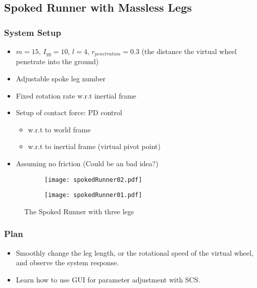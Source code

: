 \subsection{Spoked Runner with Massless Legs}
\subsubsection*{System Setup}
\begin{itemize}

\item $m=15 $, $I_{yy} = 10$,  $l=4$,  $r_{penetration} = 0.3$ (the distance the virtual wheel penetrate into the ground)
\item Adjustable spoke leg number
\item Fixed rotation rate w.r.t inertial frame
\item Setup of contact force: PD control
\begin{itemize}
\item w.r.t to world frame
\item w.r.t to inertial frame (virtual pivot point)
\end{itemize}
\item Assuming no friction (Could be an bad idea?)
\end{itemize}
\begin{figure}[H]
\begin{subfigure}{.5\textwidth}
  \centering
  \texttt{[image: spokedRunner02.pdf]}
\end{subfigure}%
\begin{subfigure}{.5\textwidth}
  \centering
  \texttt{[image: spokedRunner01.pdf]}
\end{subfigure}
\caption{The Spoked Runner with three legs}
\label{fig:spokedRunner}
\end{figure}

\subsubsection*{Plan}

\begin{itemize}
\item Smoothly change the leg length, or the rotational speed of the virtual wheel, and observe the system response.
\item Learn how to use GUI for parameter adjustment with SCS.
\end{itemize}

